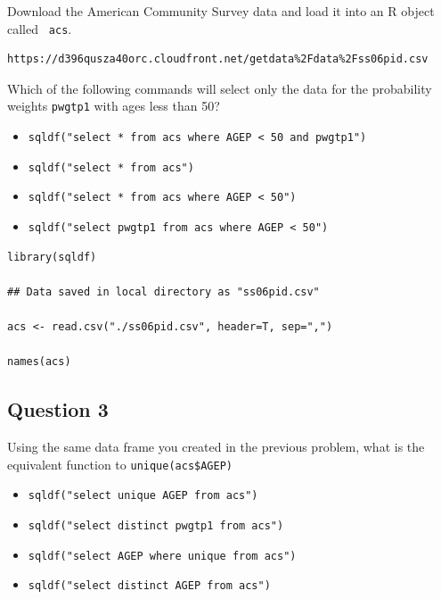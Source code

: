 \bigskip
\noindent Download the American Community Survey data and load it into an R object called
\texttt{ acs}.

\begin{verbatim}
https://d396qusza40orc.cloudfront.net/getdata%2Fdata%2Fss06pid.csv 
\end{verbatim}

\noindent Which of the following commands will select only the data for the probability weights \texttt{pwgtp1} with ages less than 50?
\begin{itemize}
\item[(i)] \texttt{sqldf("select * from acs where AGEP < 50 and pwgtp1")}
\item[(ii)] \texttt{sqldf("select * from acs")}
\item[(iii)] \texttt{sqldf("select * from acs where AGEP < 50")}
\item[(iv)] \texttt{sqldf("select pwgtp1 from acs where AGEP < 50")}
\end{itemize}

\begin{framed}
\begin{verbatim}
library(sqldf)

## Data saved in local directory as "ss06pid.csv"

acs <- read.csv("./ss06pid.csv", header=T, sep=",")

names(acs)
\end{verbatim}
\end{framed}
\newpage
\subsection*{Question 3}
Using the same data frame you created in the previous problem, what is the equivalent function to \texttt{unique(acs\$AGEP)}
\begin{itemize}
\item[(i)] \texttt{sqldf("select unique AGEP from acs")}
\item[(ii)] \texttt{sqldf("select distinct pwgtp1 from acs")}
\item[(iii)] \texttt{sqldf("select AGEP where unique from acs")}
\item[(iv)] \texttt{sqldf("select distinct AGEP from acs")}
\end{itemize}

\newpage
